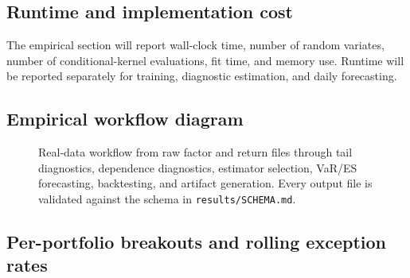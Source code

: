 \begin{table}[p]
\centering

\caption[Real-data figure replacement registry]{Planned real-data figure
replacement registry. Each placeholder figure has a source CSV and replacement
rule so that visual results can be regenerated without changing labels or
captions. The cells in this table are real categorical descriptors.}
\label{tab:planned-real-data-figures-current}
\end{table}

\subsection{Runtime and implementation cost}

The empirical section will report wall-clock time, number of random variates,
number of conditional-kernel evaluations, fit time, and memory use. Runtime
will be reported separately for training, diagnostic estimation, and daily
forecasting.

\begin{table}[p]
\centering

\caption[Runtime]{Runtime and
computational-cost placeholder. Values are \xx{} placeholders. The final
table will report per-date forecast cost, per-replicate cost, total runtime,
and work-normalized relative error for each estimator.}
\label{tab:runtime-placeholder}
\end{table}

\subsection{Empirical workflow diagram}

\begin{figure}[p]
\centering

\caption[Real-data workflow]{Real-data workflow from raw factor and return
files through tail diagnostics, dependence diagnostics, estimator selection,
VaR/ES forecasting, backtesting, and artifact generation. Every output file
is validated against the schema in \texttt{results/SCHEMA.md}.}
\label{fig:real-data-workflow}
\end{figure}

\subsection{Per-portfolio breakouts and rolling exception rates}



